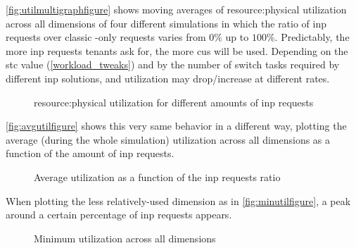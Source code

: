 \autoref{fig:utilmultigraphfigure} shows moving averages of \gls{resource:physical} utilization across all dimensions of four different simulations in which the ratio of \gls{inp} requests over classic -only requests varies from $0\%$ up to $100\%$.
Predictably, the more \gls{inp} requests tenants ask for, the more \glspl{cu} will be used.
Depending on the \gls{stc} value (\autoref{workload_tweaks}) and by the number of switch tasks required by different \gls{inp} solutions,  and  utilization may drop/increase at different rates.
\begin{figure}[!htb]
    \centering
    \usebox{\utilmultigraphfigure}
    \caption{\Gls{resource:physical} utilization for different amounts of \gls{inp} requests}
    \label{fig:utilmultigraphfigure}
\end{figure}

\autoref{fig:avgutilfigure} shows this very same behavior in a different way, plotting the average (during the whole simulation)  utilization across all dimensions as a function of the amount of \gls{inp} requests.
\begin{figure}[!htb]
    \centering
    \usebox{\avgutilfigure}
    \caption{Average  utilization as a function of the \gls{inp} requests ratio}
    \label{fig:avgutilfigure}
\end{figure}

When plotting the less relatively-used  dimension as in \autoref{fig:minutilfigure}, a peak around a certain percentage of \gls{inp} requests appears.
\begin{figure}[!htb]
    \centering
    \usebox{\minutilfigure}
    \caption{Minimum  utilization across all dimensions}
    \label{fig:minutilfigure}
\end{figure}

